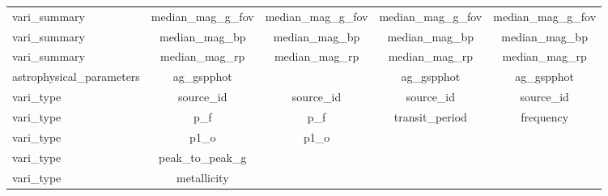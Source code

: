 \begin{table}[H]
\begin{subtable}[h]{1.15\textwidth}
{\begin{tabular}{ccccc}
\multicolumn{1}{l|}{vari\_summary}            & median\_mag\_g\_fov                                                                & median\_mag\_g\_fov                                                                &       median\_mag\_g\_fov      &  median\_mag\_g\_fov                                                                \\
\multicolumn{1}{l|}{vari\_summary}            & median\_mag\_bp                                                                    & median\_mag\_bp                                                                    &      median\_mag\_bp     &      median\_mag\_bp                                                                          \\
\multicolumn{1}{l|}{vari\_summary}            & median\_mag\_rp                                                                    & median\_mag\_rp                                                                    &       median\_mag\_rp       & median\_mag\_rp                                                                \\
\multicolumn{1}{l|}{astrophysical\_parameters} &                ag\_gspphot &                   &     ag\_gspphot                &                                ag\_gspphot                             \\
\multicolumn{1}{l|}{vari\_type}               & source\_id    & source\_id                                                                     & source\_id                                                                                               &   source\_id                                                         \\
\multicolumn{1}{l|}{vari\_type}               & p\_f     & p\_f                                                                          & transit\_period                                                                               & frequency      \\
\multicolumn{1}{l|}{vari\_type}               &    p1\_o     & p1\_o                                                                          &      &          \\
\multicolumn{1}{l|}{vari\_type}               & peak\_to\_peak\_g     &                                                             &                                                                 &            \\
\multicolumn{1}{l|}{vari\_type}               & metallicity   &                                                                     &                                                                        &                    \\

\end{tabular}}
\end{subtable}
\end{table}
